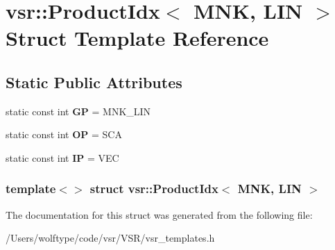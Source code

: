 \hypertarget{structvsr_1_1_product_idx_3_01_m_n_k_00_01_l_i_n_01_4}{\section{vsr\-:\-:Product\-Idx$<$ M\-N\-K, L\-I\-N $>$ Struct Template Reference}
\label{structvsr_1_1_product_idx_3_01_m_n_k_00_01_l_i_n_01_4}
}
\subsection*{Static Public Attributes}
\begin{DoxyCompactItemize}
\item 
\hypertarget{structvsr_1_1_product_idx_3_01_m_n_k_00_01_l_i_n_01_4_aaf34d1ef1d237e8c20be0c3df7a55b47}{static const int {\bfseries G\-P} = M\-N\-K\-\_\-\-L\-I\-N}\label{structvsr_1_1_product_idx_3_01_m_n_k_00_01_l_i_n_01_4_aaf34d1ef1d237e8c20be0c3df7a55b47}

\item 
\hypertarget{structvsr_1_1_product_idx_3_01_m_n_k_00_01_l_i_n_01_4_a361f6c02bbc4d049ca24c23b5a0f5e75}{static const int {\bfseries O\-P} = S\-C\-A}\label{structvsr_1_1_product_idx_3_01_m_n_k_00_01_l_i_n_01_4_a361f6c02bbc4d049ca24c23b5a0f5e75}

\item 
\hypertarget{structvsr_1_1_product_idx_3_01_m_n_k_00_01_l_i_n_01_4_a6e029a1f76bad6786dd0a7ff2be04258}{static const int {\bfseries I\-P} = V\-E\-C}\label{structvsr_1_1_product_idx_3_01_m_n_k_00_01_l_i_n_01_4_a6e029a1f76bad6786dd0a7ff2be04258}

\end{DoxyCompactItemize}
\subsubsection*{template$<$$>$ struct vsr\-::\-Product\-Idx$<$ M\-N\-K, L\-I\-N $>$}



The documentation for this struct was generated from the following file\-:\begin{DoxyCompactItemize}
\item 
/\-Users/wolftype/code/vsr/\-V\-S\-R/vsr\-\_\-templates.\-h\end{DoxyCompactItemize}
